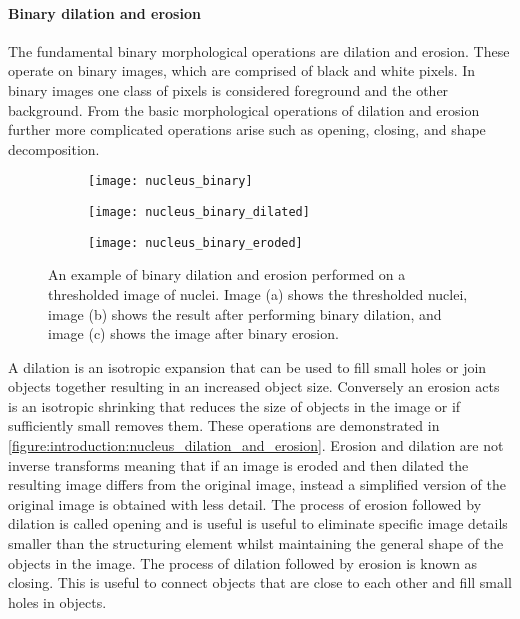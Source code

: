 \paragraph{Binary dilation and erosion}
The fundamental binary morphological operations are dilation and erosion. These operate on binary images, which are comprised of black and white pixels. In binary images one class of pixels is considered foreground and the other background. From the basic morphological operations of dilation and erosion further more complicated operations arise such as opening, closing, and shape decomposition.

\begin{figure}[htbp!]\centering
	\begin{subfigure}[b]{0.32\linewidth}
		\centering
		\texttt{[image: nucleus\_binary]}
		\caption{}
		\label{figure:introduction:nucleus_binary}
	\end{subfigure}
	\begin{subfigure}[b]{0.32\linewidth}
		\centering
		\texttt{[image: nucleus\_binary\_dilated]}
		\caption{}
		\label{figure:introduction:nucleus_dilated}
	\end{subfigure}
	\begin{subfigure}[b]{0.32\linewidth}
		\centering
		\texttt{[image: nucleus\_binary\_eroded]}
		\caption{}
		\label{figure:introduction:nucleus_erosion}
	\end{subfigure}
\caption[Binary dilation and erosion]{An example of binary dilation and erosion performed on a thresholded image of nuclei. Image (a) shows the thresholded nuclei, image (b) shows the result after performing binary dilation, and image (c) shows the image after binary erosion.}
\label{figure:introduction:nucleus_dilation_and_erosion}
\end{figure}

A dilation is an isotropic expansion that can be used to fill small holes or join objects together resulting in an increased object size. Conversely an erosion acts is an isotropic shrinking that reduces the size of objects in the image or if sufficiently small removes them. These operations are demonstrated in \autoref{figure:introduction:nucleus_dilation_and_erosion}. Erosion and dilation are not inverse transforms meaning that if an image is eroded and then dilated the resulting image differs from the original image, instead a simplified version of the original image is obtained with less detail. The process of erosion followed by dilation is called opening and is useful is useful to eliminate specific image details smaller than the structuring element whilst maintaining the general shape of the objects in the image. The process of dilation followed by erosion is known as closing. This is useful to connect objects that are close to each other and fill small holes in objects.

